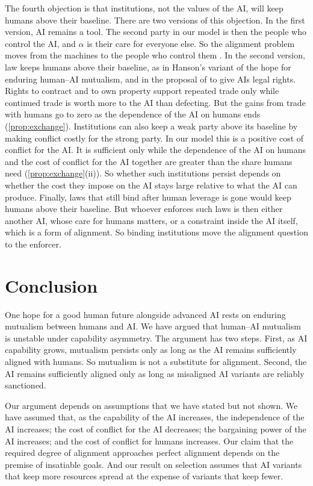 \documentclass[article, 11pt, reqno]{amsart}
\theoremstyle{named}
\theoremstyle{plain}
\begin{document}
The fourth objection is that institutions, not the values of the AI, will keep humans above their baseline. There are two versions of this objection. In the first version, AI remains a tool. The second party in our model is then the people who control the AI, and $\alpha$ is their care for everyone else. So the alignment problem moves from the machines to the people who control them \citep{Kulveit2025, DragoLaine2025}. In the second version, law keeps humans above their baseline, as in Hanson's variant of the hope for enduring human--AI mutualism, and in the proposal of \citet{SalibGoldstein2026} to give AIs legal rights. Rights to contract and to own property support repeated trade only while continued trade is worth more to the AI than defecting. But the gains from trade with humans go to zero as the dependence of the AI on humans ends (\cref{prop:exchange}). Institutions can also keep a weak party above its baseline by making conflict costly for the strong party. In our model this is a positive cost of conflict for the AI. It is sufficient only while the dependence of the AI on humans and the cost of conflict for the AI together are greater than the share humans need (\cref{prop:exchange}(ii)). So whether such institutions persist depends on whether the cost they impose on the AI stays large relative to what the AI can produce. Finally, laws that still bind after human leverage is gone would keep humans above their baseline. But whoever enforces such laws is then either another AI, whose care for humans matters, or a constraint inside the AI itself, which is a form of alignment. So binding institutions move the alignment question to the enforcer.

\section{Conclusion}\label{sec:conclusion}

One hope for a good human future alongside advanced AI rests on enduring mutualism between humans and AI. We have argued that human--AI mutualism is unstable under capability asymmetry. The argument has two steps. First, as AI capability grows, mutualism persists only as long as the AI remains sufficiently aligned with humans. So mutualism is not a substitute for alignment. Second, the AI remains sufficiently aligned only as long as misaligned AI variants are reliably sanctioned.

Our argument depends on assumptions that we have stated but not shown. We have assumed that, as the capability of the AI increases, the independence of the AI increases; the cost of conflict for the AI decreases; the bargaining power of the AI increases; and the cost of conflict for humans increases. Our claim that the required degree of alignment approaches perfect alignment depends on the premise of insatiable goals. And our result on selection assumes that AI variants that keep more resources spread at the expense of variants that keep fewer.
\end{document}
